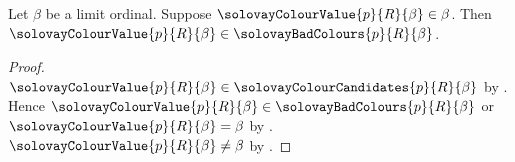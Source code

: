 \begin{proposition}\label{solovay_colour_value_bad}
    Let $\beta$ be a limit ordinal.
    Suppose $\solovayColourValue{p}{R}{\beta}\in\beta$.
    Then $\solovayColourValue{p}{R}{\beta}
        \in\solovayBadColours{p}{R}{\beta}$.
\end{proposition}
\begin{proof}
    $\solovayColourValue{p}{R}{\beta}
        \in\solovayColourCandidates{p}{R}{\beta}$
        by .
    Hence $\solovayColourValue{p}{R}{\beta}
            \in\solovayBadColours{p}{R}{\beta}$ or
        $\solovayColourValue{p}{R}{\beta}=\beta$
        by .
    $\solovayColourValue{p}{R}{\beta}\neq\beta$
        by .
\end{proof}

